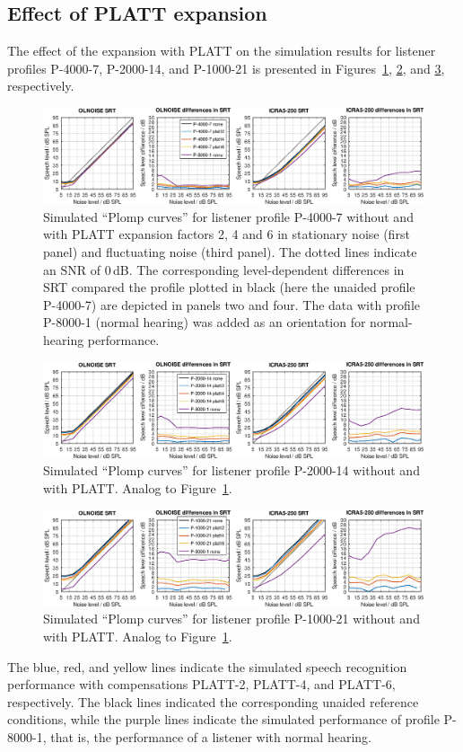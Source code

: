 \documentclass[10pt,a4paper,twocolumn]{article}
\begin{document}
\subsection*{Effect of PLATT expansion}
%
The effect of the expansion with PLATT on the simulation results for listener profiles P-4000-7, P-2000-14, and P-1000-21 is presented in Figures~\ref{fig:16}, \ref{fig:17}, and \ref{fig:18}, respectively.
%
\begin{figure}[h!]
  \centerline{\includegraphics[width=\textwidth]{images/SRTs-platt-P-4000-7}}
	\caption{Simulated \enquote{Plomp curves} for listener profile P-4000-7 without and with PLATT expansion factors 2, 4 and 6 in stationary noise (first panel) and fluctuating noise (third panel).
	The dotted lines indicate an SNR of 0\,dB.
	The corresponding level-dependent differences in SRT compared the profile plotted in black (here the unaided profile P-4000-7) are depicted in panels two and four.
	The data with profile P-8000-1 (normal hearing) was added as an orientation for normal-hearing performance.}
  \label{fig:16}
\end{figure}
%
\begin{figure}[h!]
  \centerline{\includegraphics[width=\textwidth]{images/SRTs-platt-P-2000-14}}
  \caption{Simulated \enquote{Plomp curves} for listener profile P-2000-14 without and with PLATT. Analog to Figure~\ref{fig:16}.}
  \label{fig:17}
\end{figure}
%
\begin{figure}[h!]
  \centerline{\includegraphics[width=\textwidth]{images/SRTs-platt-P-1000-21}}
  \caption{Simulated \enquote{Plomp curves} for listener profile P-1000-21 without and with PLATT. Analog to Figure~\ref{fig:16}.}
  \label{fig:18}
\end{figure}
%
The blue, red, and yellow lines indicate the simulated speech recognition performance with compensations PLATT-2, PLATT-4, and PLATT-6, respectively.
%
The black lines indicated the corresponding unaided reference conditions, while the purple lines indicate the simulated performance of profile P-8000-1, that is, the performance of a listener with normal hearing.
\end{document}
